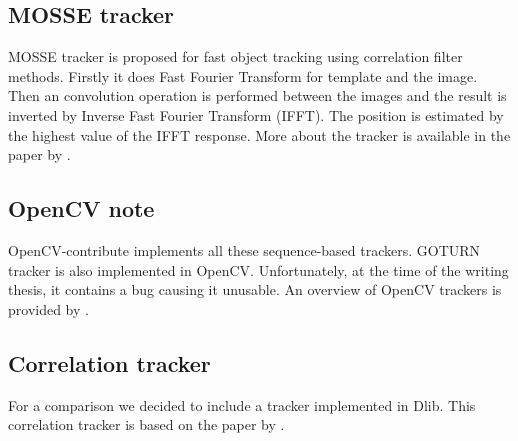 \subsection*{MOSSE tracker}
MOSSE tracker is proposed for fast object tracking using correlation filter
methods. Firstly it does Fast Fourier Transform for template and the image.
Then an convolution operation is performed between the images and the result is
inverted by Inverse Fast Fourier Transform (IFFT). The position is estimated by
the highest value of the IFFT response. More about the tracker is available in
the paper by \citet*{mosse}.

\subsection*{OpenCV note}
OpenCV-contribute implements all these sequence-based trackers. GOTURN tracker
is also implemented in OpenCV. Unfortunately, at the time of the writing
thesis, it contains a bug causing it unusable. An overview of OpenCV trackers is
provided by \citet*{opencv-trackers}.

\subsection*{Correlation tracker}
For a comparison we decided to include a tracker implemented in Dlib. This
correlation tracker is based on the paper by \citet*{correlation}.

